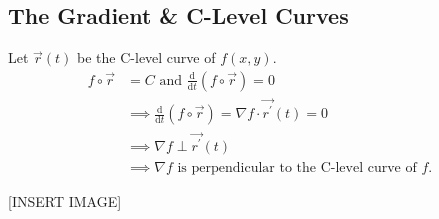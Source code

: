 \subsection{The Gradient \& C-Level Curves}
\noindent
Let $\vec{r}(t)$ be the C-level curve of $f(x, y)$.
\begin{align*}
f\circ\vec{r} &= C  \text{ and } \frac{\mathrm{d}}{\mathrm{d}t}(f\circ\vec{r}) = 0 \\
	&\implies \frac{\mathrm{d}}{\mathrm{d}t}(f\circ\vec{r}) = \nabla f\cdot\vec{r^\prime}(t) = 0 \\
	&\implies \nabla f\perp\vec{r^\prime}(t) \\
	&\implies \nabla f \text{ is perpendicular to the C-level curve of } f.
\end{align*}

[INSERT IMAGE]